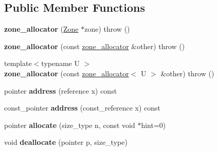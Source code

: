 \subsection*{Public Member Functions}
\begin{DoxyCompactItemize}
\item 
\hypertarget{classv8_1_1internal_1_1zone__allocator_a78b2d8217989b0861c8acc695c5599cc}{}{\bfseries zone\+\_\+allocator} (\hyperlink{classv8_1_1internal_1_1_zone}{Zone} $\ast$zone)  throw ()\label{classv8_1_1internal_1_1zone__allocator_a78b2d8217989b0861c8acc695c5599cc}

\item 
\hypertarget{classv8_1_1internal_1_1zone__allocator_a7c14fb89509fd91fa273afd9bbe04e21}{}{\bfseries zone\+\_\+allocator} (const \hyperlink{classv8_1_1internal_1_1zone__allocator}{zone\+\_\+allocator} \&other)  throw ()\label{classv8_1_1internal_1_1zone__allocator_a7c14fb89509fd91fa273afd9bbe04e21}

\item 
\hypertarget{classv8_1_1internal_1_1zone__allocator_aad25da967d9ebd3a9736907d5970b473}{}{\footnotesize template$<$typename U $>$ }\\{\bfseries zone\+\_\+allocator} (const \hyperlink{classv8_1_1internal_1_1zone__allocator}{zone\+\_\+allocator}$<$ U $>$ \&other)  throw ()\label{classv8_1_1internal_1_1zone__allocator_aad25da967d9ebd3a9736907d5970b473}

\item 
\hypertarget{classv8_1_1internal_1_1zone__allocator_a447522d95f8ea0db3d4601b4c67a5c1f}{}pointer {\bfseries address} (reference x) const \label{classv8_1_1internal_1_1zone__allocator_a447522d95f8ea0db3d4601b4c67a5c1f}

\item 
\hypertarget{classv8_1_1internal_1_1zone__allocator_a32b315102b63d6dc726d8ca530ede541}{}const\+\_\+pointer {\bfseries address} (const\+\_\+reference x) const \label{classv8_1_1internal_1_1zone__allocator_a32b315102b63d6dc726d8ca530ede541}

\item 
\hypertarget{classv8_1_1internal_1_1zone__allocator_ad3c946af3d4d514e5bf6586e7823ee97}{}pointer {\bfseries allocate} (size\+\_\+type n, const void $\ast$hint=0)\label{classv8_1_1internal_1_1zone__allocator_ad3c946af3d4d514e5bf6586e7823ee97}

\item 
\hypertarget{classv8_1_1internal_1_1zone__allocator_acc31da3cfb64e71a5f7188f366800ca4}{}void {\bfseries deallocate} (pointer p, size\+\_\+type)\label{classv8_1_1internal_1_1zone__allocator_acc31da3cfb64e71a5f7188f366800ca4}


\end{DoxyCompactItemize}
